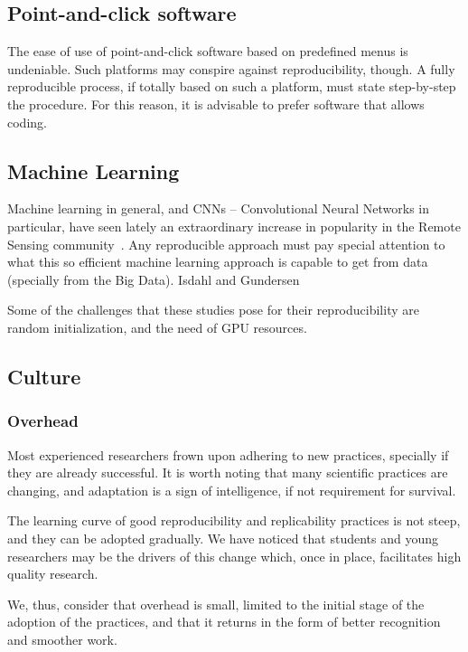 \documentclass[journal,twoside]{IEEEtran}
\begin{document}
\subsection{Point-and-click software}

The ease of use of point-and-click software based on predefined menus is undeniable.
Such platforms may conspire against reproducibility, though.
A fully reproducible process, if totally based on such a platform, must state step-by-step the procedure.
For this reason, it is advisable to prefer software that allows coding.

\subsection{Machine Learning}

Machine learning in general, and CNNs -- Convolutional Neural Networks in particular, have seen lately an extraordinary increase in popularity in the Remote Sensing community~\cite{DeepLearningandProcessUnderstandingforDataDrivenEarthSystemScience}. 
Any reproducible approach must pay special attention to what this so efficient machine learning approach is capable to get from data (specially from the Big Data).
Isdahl and Gundersen~\cite{OutoftheBoxReproducibilityaSurveyofMachineLearningPlatforms}

Some of the challenges that these studies pose for their reproducibility are random initialization, and the need of GPU resources. 

\subsection{Culture}

\subsubsection{Overhead}

Most experienced researchers frown upon adhering to new practices, specially if they are already successful.
It is worth noting that many scientific practices are changing, and adaptation is a sign of intelligence, if not requirement for survival.

The learning curve of good reproducibility and replicability practices is not steep, and they can be adopted gradually.
We have noticed that students and young researchers may be the drivers of this change which, once in place, facilitates high quality research.

We, thus, consider that overhead is small, limited to the initial stage of the adoption of the practices, and that it returns in the form of better recognition and smoother work.
\end{document}
